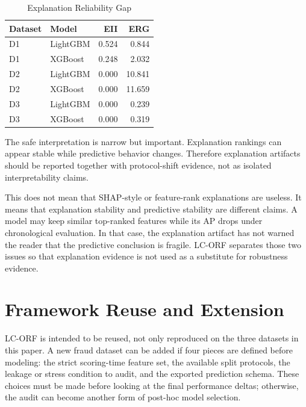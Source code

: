 \documentclass{ieeeaccess}
\begin{document}
\begin{table}[!t]
\caption{Explanation Reliability Gap}
\label{tab:erg}
\centering
\small
\renewcommand{\arraystretch}{1.10}
\begin{tabular}{|l|l|r|r|}
\hline
\textbf{Dataset} & \textbf{Model} & \textbf{EII} & \textbf{ERG}\\
\hline
D1 & LightGBM & 0.524 & 0.844\\
\hline
D1 & XGBoost & 0.248 & 2.032\\
\hline
D2 & LightGBM & 0.000 & 10.841\\
\hline
D2 & XGBoost & 0.000 & 11.659\\
\hline
D3 & LightGBM & 0.000 & 0.239\\
\hline
D3 & XGBoost & 0.000 & 0.319\\
\hline
\end{tabular}
\end{table}

The safe interpretation is narrow but important. Explanation rankings can appear stable while predictive behavior changes. Therefore explanation artifacts should be reported together with protocol-shift evidence, not as isolated interpretability claims.

This does not mean that SHAP-style or feature-rank explanations are useless. It means that explanation stability and predictive stability are different claims. A model may keep similar top-ranked features while its AP drops under chronological evaluation. In that case, the explanation artifact has not warned the reader that the predictive conclusion is fragile. LC-ORF separates those two issues so that explanation evidence is not used as a substitute for robustness evidence.

\FloatBarrier
\section{Framework Reuse and Extension}
\label{sec:reuse}
LC-ORF is intended to be reused, not only reproduced on the three datasets in this paper. A new fraud dataset can be added if four pieces are defined before modeling: the strict scoring-time feature set, the available split protocols, the leakage or stress condition to audit, and the exported prediction schema. These choices must be made before looking at the final performance deltas; otherwise, the audit can become another form of post-hoc model selection.
\end{document}
